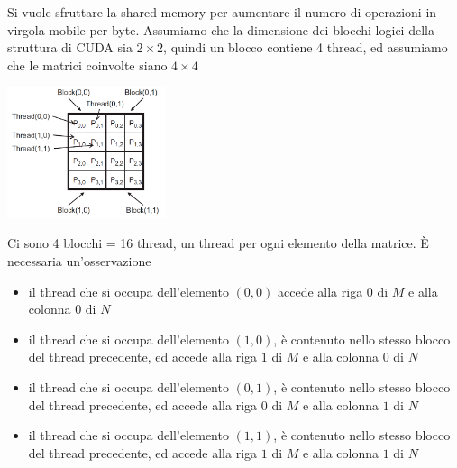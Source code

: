 \documentclass[10pt, letterpaper]{report}
\begin{document}
Si vuole sfruttare la shared memory per aumentare il numero di operazioni in virgola mobile per byte.\acc 
Assumiamo che la dimensione dei blocchi logici della struttura di CUDA sia $2\times 2$, quindi un blocco contiene 4 thread, ed assumiamo che le matrici coinvolte siano $4\times 4$\begin{center}
    \includegraphics[width=0.35\textwidth ]{images/2x2block.png}\end{center}
Ci sono 4 blocchi = 16 thread, un thread per ogni elemento della matrice. È necessaria un'osservazione\begin{itemize}
    \item il thread che si occupa dell'elemento $(0,0)$ accede alla riga $0$ di $M$ e alla colonna $0$ di $N$
    \item il thread che si occupa dell'elemento $(1,0)$, è contenuto nello stesso blocco del thread precedente, ed accede alla riga $1$ di $M$ e alla colonna $0$ di $N$
    \item il thread che si occupa dell'elemento $(0,1)$, è contenuto nello stesso blocco del thread precedente, ed accede alla riga $0$ di $M$ e alla colonna $1$ di $N$
    \item  il thread che si occupa dell'elemento $(1,1)$, è contenuto nello stesso blocco del thread precedente, ed accede alla riga $1$ di $M$ e alla colonna $1$ di $N$
\end{itemize}
\end{document}
